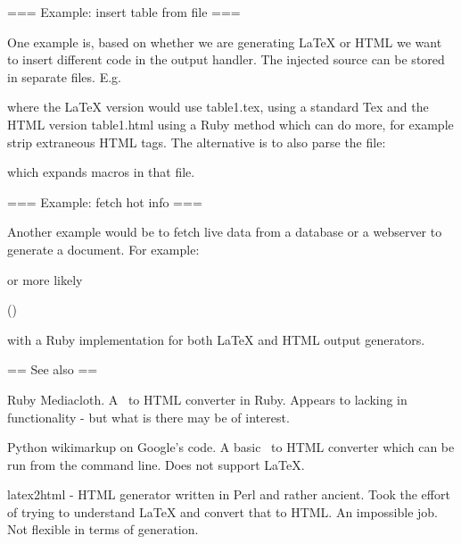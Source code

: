 === Example: insert table from file ===
  
One example is, based on whether we are generating LaTeX or HTML we
want to insert different code in the output handler. The injected
source can be stored in separate files. E.g.


where the LaTeX version would use table1.tex, using a standard Tex
 and the HTML version table1.html using a Ruby method
which can do more, for example strip extraneous HTML tags. The
alternative is to also parse the file:


which expands macros in that file.

=== Example: fetch hot info ===

Another example would be to fetch live data from a database or a
webserver to generate a document. For example:


or more likely

  \userinfo(\username)

with a Ruby implementation for both LaTeX and HTML output generators.


== See also ==

Ruby Mediacloth. A \mediawiki\ to HTML converter in Ruby. Appears to
lacking in functionality - but what is there may be of interest.

Python wikimarkup on Google's code. A basic \mediawiki\ to HTML
converter which can be run from the command line. Does not support
LaTeX.

latex2html - HTML generator written in Perl and rather ancient. Took
the effort of trying to understand LaTeX and convert that to HTML. An
impossible job. Not flexible in terms of generation.
